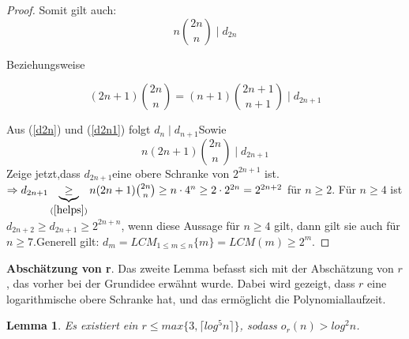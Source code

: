 \documentclass[12pt,oneside]{article}
\newtheorem{lemma}[theorem]{Lemma}
\theoremstyle{remark}
\theoremstyle{definition}
\begin{document}
\begin{proof}
Somit gilt auch: 
\begin{equation}\label{d2n}
    n {2n\choose n} \mid d_{2n}
\end{equation}

Beziehungsweise 

\begin{equation}\label{d2n1}
    (2n + 1) {2n \choose n} = (n + 1) {2n + 1 \choose n + 1} \mid d_{2n + 1} 
\end{equation}

\smallskip
Aus (\ref{d2n}) und (\ref{d2n1}) folgt $d_{n} \mid d_{n+1}$\newline\newline Sowie 
\begin{equation}\label{helps}
    n(2n + 1) {2n \choose n} \mid d_{2n + 1}
\end{equation}
\newline\newline
Zeige jetzt,dass $d_{2n+1} $eine obere Schranke von $2^{2n + 1}$ ist.\newline\newline  
$\Rightarrow d_{2n + 1} \underbrace{\geq}_{(\ref{helps})} n (2n + 1) {2n \choose n} \geq n \cdot 4^n \geq 2 \cdot 2^{2n} = 2^{2n + 2}$ für $n \geq 2$.\newline\newline
Für $n \geq 4$ ist $d_{2n + 2} \geq d_{2n + 1} \geq 2^{2n + n }$, wenn diese Aussage für $n \geq 4 $ gilt, dann gilt sie auch für $n \geq 7$.\newline\newline Generell gilt: $d_{m} = LCM_{1 \leq m \leq n} \{m\} = LCM(m) \geq  2^m $.
\end{proof}

\textbf{Abschätzung von r}.\newline\newline
Das zweite Lemma befasst sich mit der Abschätzung von $r$, das vorher bei der Grundidee erwähnt wurde. Dabei wird gezeigt, dass $r$ eine logarithmische obere Schranke hat, und das ermöglicht die Polynomiallaufzeit.  

\begin{lemma}
Es existiert ein $ r \leq max \{ 3, \lceil log^5 n \rceil \}$, sodass $o_{r}(n) > log^2 n$.
\end{lemma}
\end{document}

